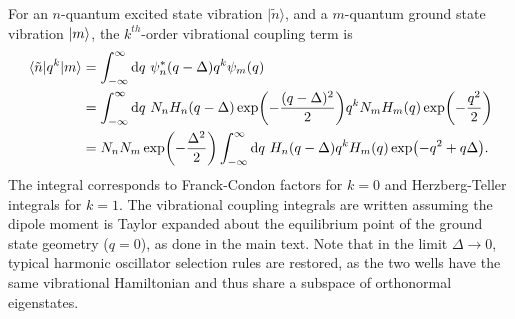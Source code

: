 \documentclass[aip, jcp, reprint, onecolumn, nofootinbib]{revtex4-2}
\begin{document}
For an $n$-quantum excited state vibration $| \tilde{n} \rangle$, and a $m$-quantum ground state vibration $\ket{m}$, the $k^{th}$-order vibrational coupling term is
\begin{equation}
	\begin{split}
		\mel{\tilde{n}}{q^k}{m} &= \int_{-\infty}^\infty \mathrm{d}q \ \psi^*_n(q-\Delta) q^k \psi_m(q)\\
		&= \int_{-\infty}^\infty \mathrm{d}q \ N_n H_n(q-\Delta) \exp(-\frac{(q - \Delta)^2}{2}) q^k N_m H_m(q) \exp(-\frac{q^2}{2}) \\
		&= N_n N_m \exp(-\frac{\Delta^2}{2}) \int_{-\infty}^\infty \mathrm{d}q \ H_n(q-\Delta) q^k H_m(q) \exp(-q^2 + q\Delta).
	\end{split}\label{key}
\end{equation}
The integral corresponds to Franck-Condon factors for $k=0$ and Herzberg-Teller integrals for $k=1$.
The vibrational coupling integrals are written assuming the dipole moment is Taylor expanded about the equilibrium point of the ground state geometry ($q=0$), as done in the main text.
Note that in the limit $\Delta \rightarrow 0$, typical harmonic oscillator selection rules are restored, as the two wells have the same vibrational Hamiltonian and thus share a subspace of orthonormal eigenstates.
\end{document}
